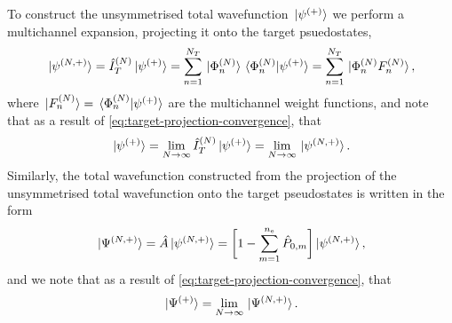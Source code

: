 \documentclass[]{article}
\begin{document}
To construct the unsymmetrised total wavefunction $\ket*{\psi^{(+)}}$ we
perform a multichannel expansion, projecting it onto the target psuedostates,
\begin{equation}
  \label{eq:total-wavefunction-unsymmetrised-n}
  \ket*{\psi^{\lr{N, +}}}
  =
  \hat{I}_{T}^{\lr{N}}
  \ket*{\psi^{\lr{+}}}
  =
  \sum_{n = 1}^{N_{T}}
  \ket*{\Phi_{n}^{\lr{N}}}
  \bra*{\Phi_{n}^{\lr{N}}}
  \ket*{\psi^{\lr{+}}}
  =
  \sum_{n = 1}^{N_{T}}
  \ket*{\Phi_{n}^{\lr{N}} F_{n}^{\lr{N}}}
  ,
\end{equation}
where $\ket*{F_{n}^{(N)}} = \bra*{\Phi_{n}^{(N)}}\ket*{\psi^{(+)}}$ are
the multichannel weight functions, and note that as a result of
\eqref{eq:target-projection-convergence}, that
\begin{equation}
  \label{eq:total-wavefunction-unsymmetrised-convergence}
  \ket*{\psi^{\lr{+}}}
  =
  \lim_{N \to \infty}
  \hat{I}_{T}^{\lr{N}}
  \ket*{\psi^{\lr{+}}}
  =
  \lim_{N \to \infty}
  \ket*{\psi^{\lr{N, +}}}
  .
\end{equation}
Similarly, the total wavefunction constructed from the projection of the
unsymmetrised total wavefunction onto the target pseudostates is written in the
form
\begin{equation}
  \label{eq:total-wavefunction-antisymmetrisation-n}
  \ket*{\Psi^{\lr{N, +}}}
  =
  \hat{A}
  \ket*{\psi^{\lr{N, +}}}
  =
  \lrsq[\bigg]
  {
    1
    -
    \sum_{m = 1}^{n_{\mathrm{e}}}
    \hat{P}_{0, m}
  }
  \ket*{\psi^{\lr{N, +}}}
  ,
\end{equation}
and we note that as a result of \eqref{eq:target-projection-convergence}, that
\begin{equation}
  \label{eq:total-wavefunction-antisymmetrisation-convergence}
  \ket*{\Psi^{\lr{+}}}
  =
  \lim_{N \to \infty}
  \ket*{\Psi^{\lr{N, +}}}
  .
\end{equation}
\end{document}
